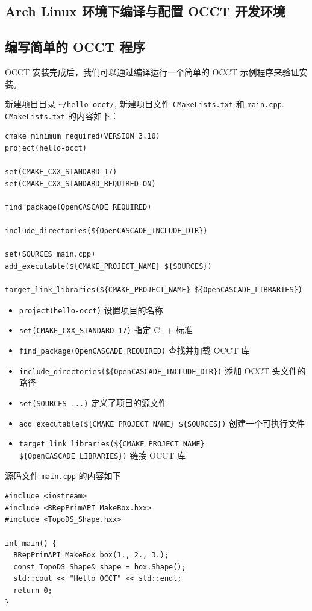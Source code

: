 \documentclass[11pt]{article}
\begin{document}
\subsection{Arch Linux 环境下编译与配置 OCCT 开发环境}
\label{sec:org1dfa2b6}

\subsection{编写简单的 OCCT 程序}
\label{sec:org8f6bb19}

OCCT 安装完成后，我们可以通过编译运行一个简单的 OCCT 示例程序来验证安装。

新建项目目录 \texttt{\textasciitilde{}/hello-occt/}, 新建项目文件 \texttt{CMakeLists.txt} 和 \texttt{main.cpp}. \texttt{CMakeLists.txt} 的内容如下：

\begin{verbatim}
cmake_minimum_required(VERSION 3.10)
project(hello-occt)

set(CMAKE_CXX_STANDARD 17)
set(CMAKE_CXX_STANDARD_REQUIRED ON)

find_package(OpenCASCADE REQUIRED)

include_directories(${OpenCASCADE_INCLUDE_DIR})

set(SOURCES main.cpp)
add_executable(${CMAKE_PROJECT_NAME} ${SOURCES})

target_link_libraries(${CMAKE_PROJECT_NAME} ${OpenCASCADE_LIBRARIES})
\end{verbatim}

\begin{itemize}
\item \texttt{project(hello-occt)} 设置项目的名称
\item \texttt{set(CMAKE\_CXX\_STANDARD 17)} 指定 C++ 标准
\item \texttt{find\_package(OpenCASCADE REQUIRED)} 查找并加载 OCCT 库
\item \texttt{include\_directories(\$\{OpenCASCADE\_INCLUDE\_DIR\})} 添加 OCCT 头文件的路径
\item \texttt{set(SOURCES ...)} 定义了项目的源文件
\item \texttt{add\_executable(\$\{CMAKE\_PROJECT\_NAME\} \$\{SOURCES\})} 创建一个可执行文件
\item \texttt{target\_link\_libraries(\$\{CMAKE\_PROJECT\_NAME\} \$\{OpenCASCADE\_LIBRARIES\})} 链接 OCCT 库
\end{itemize}

源码文件 \texttt{main.cpp} 的内容如下

\begin{verbatim}
#include <iostream>
#include <BRepPrimAPI_MakeBox.hxx>
#include <TopoDS_Shape.hxx>

int main() {
  BRepPrimAPI_MakeBox box(1., 2., 3.);
  const TopoDS_Shape& shape = box.Shape();
  std::cout << "Hello OCCT" << std::endl;
  return 0;
}
\end{verbatim}
\end{document}
